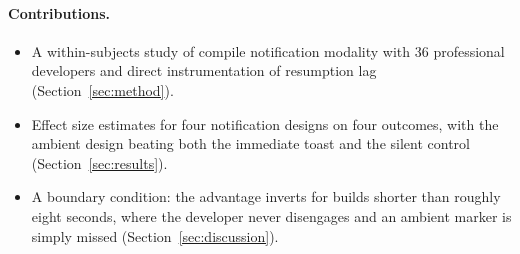 \paragraph*{Contributions.}
\begin{itemize}[leftmargin=*,itemsep=1pt,topsep=2pt]
  \item A within-subjects study of compile notification modality with 36
        professional developers and direct instrumentation of resumption lag
        (Section~\ref{sec:method}).
  \item Effect size estimates for four notification designs on four outcomes,
        with the ambient design beating both the immediate toast and the silent
        control (Section~\ref{sec:results}).
  \item A boundary condition: the advantage inverts for builds shorter than
        roughly eight seconds, where the developer never disengages and an
        ambient marker is simply missed (Section~\ref{sec:discussion}).
\end{itemize}
